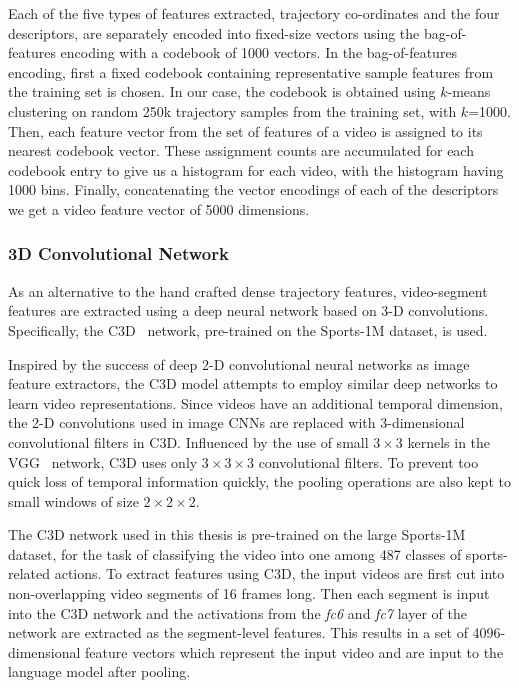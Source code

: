 Each of the five types of features extracted, trajectory co-ordinates and the
four descriptors, are separately encoded into fixed-size vectors using the
bag-of-features encoding with a codebook of 1000 vectors.
In the bag-of-features encoding, first a fixed codebook containing representative
sample features from the training set is chosen.
In our case, the codebook is obtained using $k$-means clustering on random 250k
trajectory samples from the training set, with $k$=1000.
Then, each feature vector from the set of features of a video is assigned to its
nearest codebook vector.
These assignment counts are accumulated for each codebook entry to give us a
histogram for each video, with the histogram having 1000 bins.
Finally, concatenating the vector encodings of each of the descriptors we get a
video feature vector of 5000 dimensions. 

\subsubsection{3D Convolutional Network}
As an alternative to the hand crafted dense trajectory features, video-segment
features are extracted using a deep neural network based on 3-D convolutions. 
Specifically, the C3D~\cite{DBLP:C3D} network, pre-trained on the Sports-1M
dataset, is used.

Inspired by the success of deep 2-D convolutional neural networks as image
feature extractors, the C3D model attempts to employ similar deep networks to learn
video representations.
Since videos have an additional temporal dimension, the 2-D convolutions
used in image CNNs are replaced with 3-dimensional convolutional filters in C3D.
Influenced by the use of small $3\times3$ kernels in the VGG~\cite{Simonyan14c}
network, C3D uses only $3\times3\times3$ convolutional filters.
To prevent too quick loss of temporal information quickly, the pooling
operations are also kept to small windows of size $2\times2\times2$.

The C3D network used in this thesis is pre-trained on the large Sports-1M
dataset, for the task of classifying the video into one among 487 classes of
sports-related actions.
To extract features using C3D, the input videos are first cut into non-overlapping
video segments of 16 frames long.
Then each segment is input into the C3D network and the activations from the
\emph{fc6} and \emph{fc7} layer of the network are extracted as the segment-level
features.
This results in a set of 4096-dimensional feature vectors which represent the
input video and are input to the language model after pooling.

